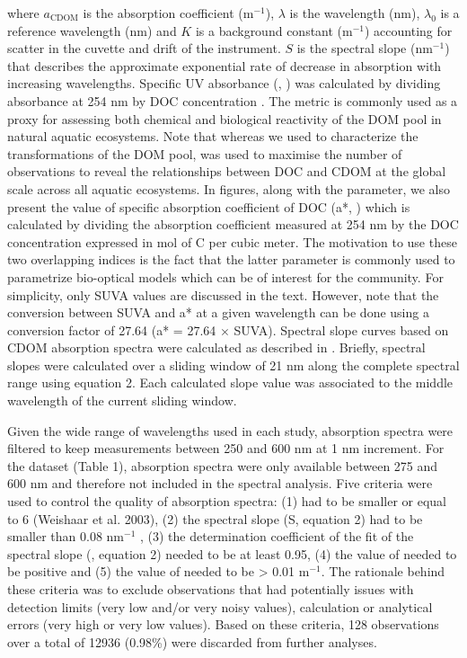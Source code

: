 where $a_{\text{CDOM}}$ is the absorption coefficient (m$^{-1}$), $\lambda$ is the wavelength (nm), $\lambda_0$ is a reference wavelength (nm) and $K$ is a background constant (m$^{-1}$) accounting for scatter in the cuvette and drift of the instrument. $S$ is the spectral slope (nm$^{-1}$) that describes the approximate exponential rate of decrease in absorption with increasing wavelengths. Specific UV absorbance (, \suvagram) was calculated by dividing absorbance at 254 nm by DOC concentration \citep{Weishaar2003}. The  metric is commonly used as a proxy for assessing both chemical \citep{Weishaar2003,Westerhoff2004} and biological reactivity \citep{Berggren2009,Asmala2013} of the DOM pool in natural aquatic ecosystems. Note that whereas we used  to characterize the transformations of the DOM pool,  was used to maximise the number of observations to reveal the relationships between DOC and CDOM at the global scale across all aquatic ecosystems. In figures, along with the  parameter, we also present the value of specific absorption coefficient of DOC (a*, \suvamol) which is calculated by dividing the absorption coefficient measured at 254 nm by the DOC concentration expressed in mol of C per cubic meter. The motivation to use these two overlapping indices is the fact that the latter parameter is commonly used to parametrize bio-optical models which can be of interest for the community. For simplicity, only SUVA values are discussed in the text. However, note that the conversion between SUVA and a* at a given wavelength can be done using a conversion factor of 27.64 (a* = 27.64 $\times$ SUVA). Spectral slope curves based on CDOM absorption spectra were calculated as described in \citet{Loiselle2009}. Briefly, spectral slopes were calculated over a sliding window of 21 nm along the complete spectral range using equation 2. Each calculated slope value was associated to the middle wavelength of the current sliding window.

Given the wide range of wavelengths used in each study, absorption spectra were filtered to keep measurements between 250 and 600 nm at 1 nm increment. For the \cite{Nelson2010} dataset (Table 1), absorption spectra were only available between 275 and 600 nm and therefore not included in the spectral analysis. Five criteria were used to control the quality of absorption spectra: (1)  had to be smaller or equal to 6 \suvagram (Weishaar et al. 2003), (2) the spectral slope (S, equation 2) had to be smaller than 0.08 nm$^{-1}$ \citep{Stedmon2015b}, (3) the determination coefficient of the fit of the spectral slope (\rr, equation 2) needed to be at least 0.95, (4) the value of  needed to be positive and (5) the value of  needed to be > 0.01 m$^{-1}$. The rationale behind these criteria was to exclude observations that had potentially issues with detection limits (very low and/or very noisy values), calculation or analytical errors (very high or very low values). Based on these criteria, 128 observations over a total of 12936 (0.98\%) were discarded from further analyses.

